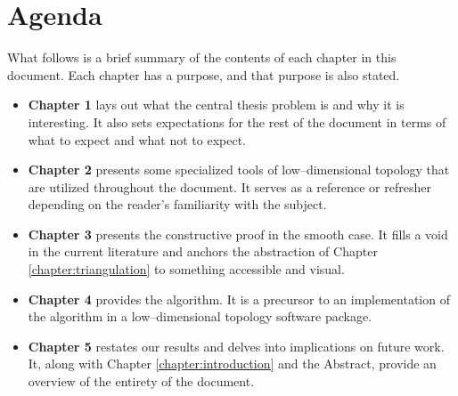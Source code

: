 \section{Agenda}

What follows is a brief summary of the contents of each chapter in this document.
Each chapter has a purpose, and that purpose is also stated.

{\renewcommand\labelitemi{}
	\begin{itemize}
		\item \textbf{Chapter 1} lays out what the central thesis problem is and why it is interesting.  It also sets expectations for the rest of the document in terms of what to expect and what not to expect.
		\item \textbf{Chapter 2} presents some specialized tools of low--dimensional topology that are utilized throughout the document.  It serves as a reference or refresher depending on the reader's familiarity with the subject.
		\item \textbf{Chapter 3} presents the constructive proof in the smooth case.  It fills a void in the current literature and anchors the abstraction of Chapter \ref{chapter:triangulation} to something accessible and visual.
		\item \textbf{Chapter 4} provides the algorithm.  It is a precursor to an implementation of the algorithm in a low--dimensional topology software package.
		\item \textbf{Chapter 5} restates our results and delves into implications on future work.  It, along with Chapter \ref{chapter:introduction} and the Abstract, provide an overview of the entirety of the document.
	\end{itemize}
}
